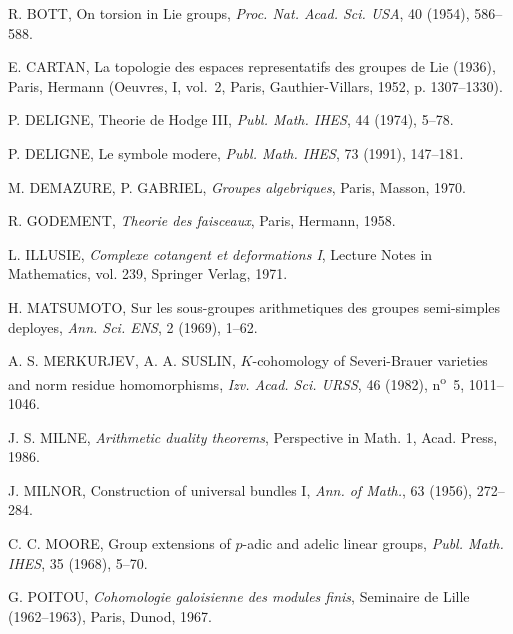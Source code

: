 \documentclass[11pt,a4paper]{article}
\theoremstyle{plain}
\theoremstyle{definition}
\begin{document}
\begin{enumerate}[label={[\arabic*]}, leftmargin=*, itemsep=0.5em]
\item R. BOTT, On torsion in Lie groups, \textit{Proc. Nat. Acad. Sci. USA}, 40 (1954), 586--588.

\item E. CARTAN, La topologie des espaces representatifs des groupes de Lie (1936), Paris, Hermann (Oeuvres, I, vol.~2, Paris, Gauthier-Villars, 1952, p. 1307--1330).

\item P. DELIGNE, Theorie de Hodge III, \textit{Publ. Math. IHES}, 44 (1974), 5--78.

\item P. DELIGNE, Le symbole modere, \textit{Publ. Math. IHES}, 73 (1991), 147--181.

\item M. DEMAZURE, P. GABRIEL, \textit{Groupes algebriques}, Paris, Masson, 1970.

\item R. GODEMENT, \textit{Theorie des faisceaux}, Paris, Hermann, 1958.

\item L. ILLUSIE, \textit{Complexe cotangent et deformations I}, Lecture Notes in Mathematics, vol. 239, Springer Verlag, 1971.

\item H. MATSUMOTO, Sur les sous-groupes arithmetiques des groupes semi-simples deployes, \textit{Ann. Sci. ENS}, 2 (1969), 1--62.

\item A. S. MERKURJEV, A. A. SUSLIN, $K$-cohomology of Severi-Brauer varieties and norm residue homomorphisms, \textit{Izv. Acad. Sci. URSS}, 46 (1982), n\textsuperscript{o}~5, 1011--1046.

\item J. S. MILNE, \textit{Arithmetic duality theorems}, Perspective in Math. 1, Acad. Press, 1986.

\item J. MILNOR, Construction of universal bundles I, \textit{Ann. of Math.}, 63 (1956), 272--284.

\item C. C. MOORE, Group extensions of $p$-adic and adelic linear groups, \textit{Publ. Math. IHES}, 35 (1968), 5--70.

\item G. POITOU, \textit{Cohomologie galoisienne des modules finis}, Seminaire de Lille (1962--1963), Paris, Dunod, 1967.


\end{enumerate}
\end{document}

